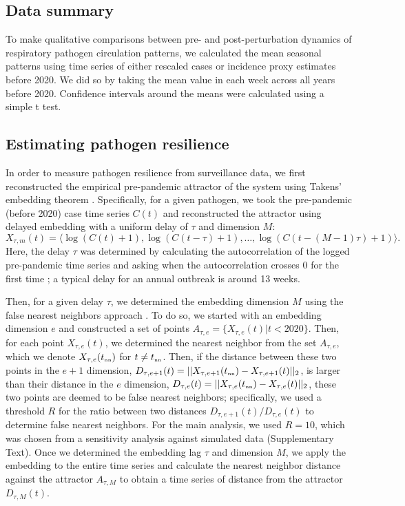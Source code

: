 \documentclass[12pt]{article}
\newcommand{\tsub}[2]{#1_{{\textrm{\tiny #2}}}}
\begin{document}
\subsection*{Data summary}

To make qualitative comparisons between pre- and post-perturbation dynamics of respiratory pathogen circulation patterns, we calculated the mean seasonal patterns using time series of either rescaled cases or incidence proxy estimates before 2020.
We did so by taking the mean value in each week across all years before 2020.
Confidence intervals around the means were calculated using a simple t test.

\subsection*{Estimating pathogen resilience}

In order to measure pathogen resilience from surveillance data, we first reconstructed the empirical pre-pandemic attractor of the system using Takens' embedding theorem \citep{takens2006detecting}.
Specifically, for a given pathogen, we took the pre-pandemic (before 2020) case time series $C(t)$ and reconstructed the attractor using delayed embedding with a uniform delay of $\tau$ and dimension $M$:
\begin{equation}
X_{\tau,m}(t) = \langle\log(C(t)+1), \log(C(t-\tau)+1), \dots, \log(C(t-(M-1)\tau)+1)\rangle.
\end{equation}
Here, the delay $\tau$ was determined by calculating the autocorrelation of the logged pre-pandemic time series and asking when the autocorrelation crosses 0 for the first time \citep{tan2023selecting};
a typical delay for an annual outbreak is around 13 weeks.

Then, for a given delay $\tau$, we determined the embedding dimension $M$ using the false nearest neighbors approach \citep{kennel1992determining,tan2023selecting}.
To do so, we started with an embedding dimension $e$ and constructed a set of points $A_{\tau,e}= \{X_{\tau,e}(t) | t < 2020\}$.
Then, for each point $X_{\tau,e}(t)$, we determined the nearest neighbor from the set $A_{\tau,e}$, which we denote $X_{\tau,e}(\tsub{t}{nn})$ for $t \neq \tsub{t}{nn}$.
Then, if the distance between these two points in the $e+1$ dimension, $D_{\tau,e+1}(t) = ||X_{\tau,e+1}(\tsub{t}{nn})-X_{\tau,e+1}(t)||_2$, is larger than their distance in the $e$ dimension, $D_{\tau,e}(t) = ||X_{\tau,e}(\tsub{t}{nn})-X_{\tau,e}(t)||_2$, these two points are deemed to be false nearest neighbors;
specifically, we used a threshold $R$ for the ratio between two distances $D_{\tau,e+1}(t)/D_{\tau,e}(t)$ to determine false nearest neighbors.
For the main analysis, we used $R=10$, which was chosen from a sensitivity analysis against simulated data (Supplementary Text).
Once we determined the embedding lag $\tau$ and dimension $M$, we apply the embedding to the entire time series and calculate the nearest neighbor distance against the attractor $A_{\tau,M}$ to obtain a time series of distance from the attractor $D_{\tau,M}(t)$.
\end{document}
